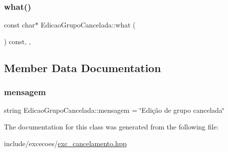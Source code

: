 \subsubsection{\texorpdfstring{what()}{what()}}
{\footnotesize\ttfamily const char$\ast$ Edicao\+Grupo\+Cancelada\+::what (\begin{DoxyParamCaption}{ }\end{DoxyParamCaption}) const\hspace{0.3cm}{\ttfamily [inline]}, {\ttfamily [override]}, {\ttfamily [noexcept]}}



\subsection{Member Data Documentation}
\mbox{\label{classEdicaoGrupoCancelada_a53370c1e225786f8e874b8368468d793}} 
\subsubsection{\texorpdfstring{mensagem}{mensagem}}
{\footnotesize\ttfamily string Edicao\+Grupo\+Cancelada\+::mensagem = \char`\"{}Edição de grupo cancelada\char`\"{}\hspace{0.3cm}{\ttfamily [private]}}



The documentation for this class was generated from the following file\+:\begin{DoxyCompactItemize}
\item 
include/excecoes/\hyperlink{exc__cancelamento_8hpp}{exc\+\_\+cancelamento.\+hpp}\end{DoxyCompactItemize}
